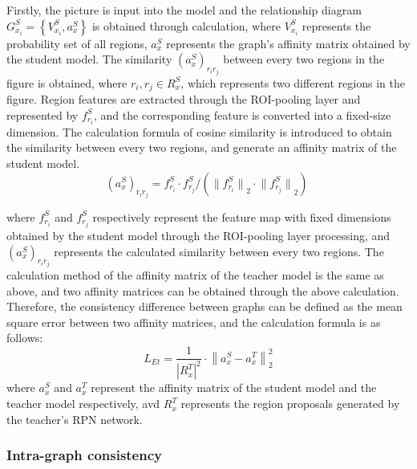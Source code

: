 \documentclass[sn-mathphys]{sn-jnl}%
\theoremstyle{thmstyleone}%
\theoremstyle{thmstyletwo}%
\theoremstyle{thmstylethree}%
\begin{document}
Firstly, the picture is input into the model and the relationship diagram $G_{{{x}_{i}}}^{S}=\left\{ V_{{{x}_{i}}}^{S},a_{x}^{S} \right\}$ is obtained through calculation, where $V_{{{x}_{i}}}^{S}$ represents the probability set of all regions, $a_{x}^{S}$ represents the graph’s affinity matrix obtained by the student model. The similarity ${{\left( a_{x}^{S} \right)}_{{{r}_{i}}{{r}_{j}}}}$ between every two regions in the figure is obtained, where ${{r}_{i}},{{r}_{j}}\in R_{x}^{S}$, which represents two different regions in the figure. Region features are extracted through the ROI-pooling layer and represented by $f_{{{r}_{i}}}^{S}$, and the corresponding feature is converted into a fixed-size dimension. The calculation formula of cosine similarity is introduced to obtain the similarity between every two regions, and generate an affinity matrix of the student model. 
\begin{equation}
{{\left( a_{x}^{S} \right)}_{{{\text{r}}_{i}}{{r}_{j}}}}={f_{{{r}_{i}}}^{S}\cdot f_{{{r}_{j}}}^{S}}/{( {{ \|f_{{{r}_{i}}}^{S}\| }_{2}} \cdot {{ \|f_{{{r}_{j}}}^{S}\| }_{2}})}\;
\label{eq:06}
\end{equation}

where $f_{{{r}_{i}}}^{S}$ and $f_{{{r}_{j}}}^{S}$ respectively represent the feature map with fixed dimensions obtained by the student model through the ROI-pooling layer processing, and ${{\left( a_{x}^{S} \right)}_{{{r}_{i}}{{r}_{j}}}}$ represents the calculated similarity between every two regions. 
The calculation method of the affinity matrix of the teacher model is the same as above, and two affinity matrices can be obtained through the above calculation. Therefore, the consistency difference between graphs can be defined as the mean square error between two affinity matrices, and the calculation formula is as follows:
\begin{equation}
{{L}_{Et}}=\frac{1}{{{\left\vert R_{x}^{T} \right\vert}^{2}}}\cdot \left\| a_{x}^{S}-a_{x}^{T} \right\|_{2}^{2}
\label{eq:07}
\end{equation}
where $a_{x}^{S}$ and $a_{x}^{T}$ represent the affinity matrix of the student model and the teacher model respectively, avd $R_{x}^{T}$ represents the region proposals generated by the teacher's RPN network.

%
%
\subsubsection{Intra-graph consistency}
\end{document}
